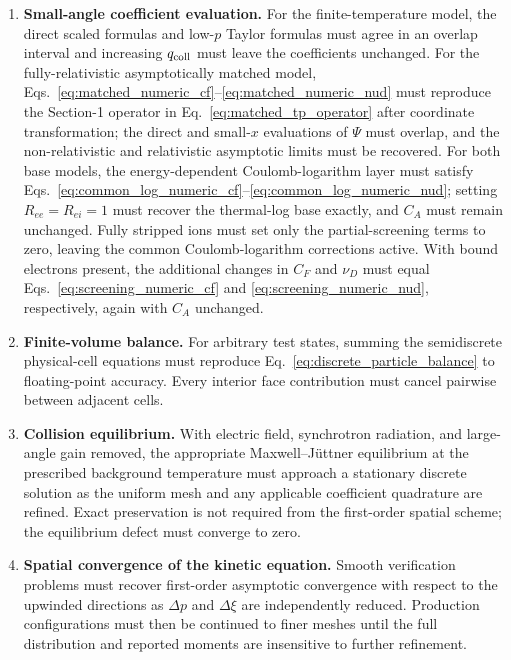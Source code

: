 \documentclass[11pt]{article}
\begin{document}
\begin{enumerate}
 \item \textbf{Small-angle coefficient evaluation.}
       For the finite-temperature model, the direct scaled formulas and low-$p$ Taylor
       formulas must agree in an overlap interval and increasing $q_{\rm coll}$ must
       leave the coefficients unchanged.  For the fully-relativistic asymptotically matched model,
       Eqs.~\eqref{eq:matched_numeric_cf}--\eqref{eq:matched_numeric_nud} must reproduce the
       Section-1 operator in Eq.~\eqref{eq:matched_tp_operator} after coordinate
       transformation; the direct and small-$x$ evaluations of $\Psi$ must overlap, and
       the non-relativistic and relativistic asymptotic limits must be recovered.
       For both base models, the energy-dependent Coulomb-logarithm layer must satisfy
       Eqs.~\eqref{eq:common_log_numeric_cf}--\eqref{eq:common_log_numeric_nud}; setting
       $R_{ee}=R_{ei}=1$ must recover the thermal-log base exactly, and $C_A$ must remain
       unchanged.  Fully stripped ions must set only the partial-screening terms to zero,
       leaving the common Coulomb-logarithm corrections active.  With bound electrons
       present, the additional changes in $C_F$ and $\nu_D$ must equal
       Eqs.~\eqref{eq:screening_numeric_cf} and \eqref{eq:screening_numeric_nud},
       respectively, again with $C_A$ unchanged.

 \item \textbf{Finite-volume balance.}
       For arbitrary test states, summing the semidiscrete physical-cell equations must
       reproduce Eq.~\eqref{eq:discrete_particle_balance} to floating-point accuracy.
       Every interior face contribution must cancel pairwise between adjacent cells.

 \item \textbf{Collision equilibrium.}
       With electric field, synchrotron radiation, and large-angle gain removed, the
       appropriate Maxwell--J{\"u}ttner equilibrium at the prescribed background
       temperature must approach a stationary discrete solution as the uniform mesh and
       any applicable coefficient quadrature are refined.  Exact preservation is not
       required from the first-order spatial scheme; the equilibrium defect must converge
       to zero.

 \item \textbf{Spatial convergence of the kinetic equation.}
       Smooth verification problems must recover first-order asymptotic convergence with
       respect to the upwinded directions as $\Delta p$ and $\Delta\xi$ are independently
       reduced.  Production configurations must then be continued to finer meshes until
       the full distribution and reported moments are insensitive to further refinement.


\end{enumerate}
\end{document}
